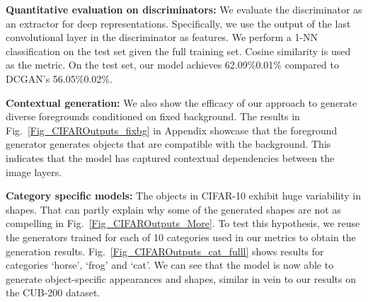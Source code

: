 \documentclass{article} \usepackage{iclr2017_conference,times}
\begin{document}
{\bf Quantitative evaluation on discriminators:}  We evaluate the discriminator as an extractor for deep representations. Specifically, we use the output of the last convolutional layer in the discriminator as features. We perform a 1-NN classification on the test set given the full training set. Cosine similarity is used as the metric. On the test set, our model achieves 62.09\%0.01\% compared to DCGAN's 56.05\%0.02\%. 

{\bf Contextual generation:} We also show the efficacy of our approach to generate diverse foregrounds conditioned on fixed background. The results in Fig.~\ref{Fig_CIFAROutputs_fixbg} in Appendix showcase that the foreground generator generates objects that are compatible with the background. This indicates that the model has captured contextual dependencies between the image layers. 

{\bf Category specific models:} The objects in CIFAR-10 exhibit huge variability in shapes. That can partly explain why some of the generated shapes are not as compelling in Fig.~\ref{Fig_CIFAROutputs_More}. To test this hypothesis, we reuse the generators trained for each of 10 categories used in our metrics to obtain the generation results. Fig.~\ref{Fig_CIFAROutputs_cat_fulll} shows results for categories `horse', `frog' and `cat'. We can see that the model is now able to generate object-specific appearances and shapes, similar in vein to our results on the CUB-200 dataset.  

%
\end{document}
